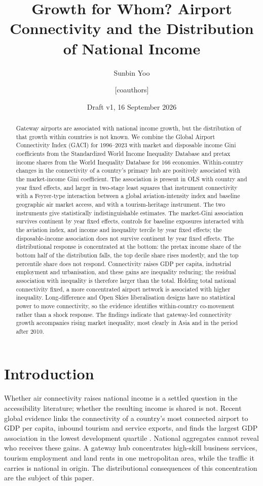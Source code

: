 \documentclass[12pt]{article}
\title{Growth for Whom? Airport Connectivity and the Distribution of National Income}
\author{Sunbin Yoo \and [coauthors]}
\date{Draft v1, 16 September 2026}
\begin{document}
\maketitle

\begin{abstract}
Gateway airports are associated with national income growth, but the distribution of that growth within countries is not known. We combine the Global Airport Connectivity Index (GACI) for 1996--2023 with market and disposable income Gini coefficients from the Standardized World Income Inequality Database and pretax income shares from the World Inequality Database for 166 economies. Within-country changes in the connectivity of a country's primary hub are positively associated with the market-income Gini coefficient. The association is present in OLS with country and year fixed effects, and larger in two-stage least squares that instrument connectivity with a Feyrer-type interaction between a global aviation-intensity index and baseline geographic air market access, and with a tourism-heritage instrument. The two instruments give statistically indistinguishable estimates. The market-Gini association survives continent by year fixed effects, controls for baseline exposures interacted with the aviation index, and income and inequality tercile by year fixed effects; the disposable-income association does not survive continent by year fixed effects. The distributional response is concentrated at the bottom: the pretax income share of the bottom half of the distribution falls, the top decile share rises modestly, and the top percentile share does not respond. Connectivity raises GDP per capita, industrial employment and urbanisation, and these gains are inequality reducing; the residual association with inequality is therefore larger than the total. Holding total national connectivity fixed, a more concentrated airport network is associated with higher inequality. Long-difference and Open Skies liberalisation designs have no statistical power to move connectivity, so the evidence identifies within-country co-movement rather than a shock response. The findings indicate that gateway-led connectivity growth accompanies rising market inequality, most clearly in Asia and in the period after 2010.
\end{abstract}

\section{Introduction}
\label{sec:intro}
Whether air connectivity raises national income is a settled question in the accessibility literature; whether the resulting income is shared is not. Recent global evidence links the connectivity of a country's most connected airport to GDP per capita, inbound tourism and service exports, and finds the largest GDP association in the lowest development quartile \citep{Yue_2026}. National aggregates cannot reveal who receives these gains. A gateway hub concentrates high-skill business services, tourism employment and land rents in one metropolitan area, while the traffic it carries is national in origin. The distributional consequences of this concentration are the subject of this paper.
\end{document}
